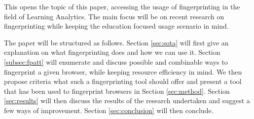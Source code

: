 This opens the topic of this paper, accessing the usage of fingerprinting in the field of Learning Analytics. The main focus will be on recent research on fingerprinting while keeping the education focused usage scenario in mind.

The paper will be structured as follows. Section \ref{sec:sota} will first give an explanation on what fingerprinting does and how we can use it. Section \ref{subsec:fpatt} will enumerate and discuss possible and combinable ways to fingerprint a given browser, while keeping resource efficiency in mind. We then propose criteria what such a fingerprinting tool should offer and present a tool that has been used to fingerprint browsers in Section \ref{sec:method}. Section \ref{sec:results} will then discuss the results of the research undertaken and suggest a few ways of improvement. Section \ref{sec:conclusion} will then conclude.
 
